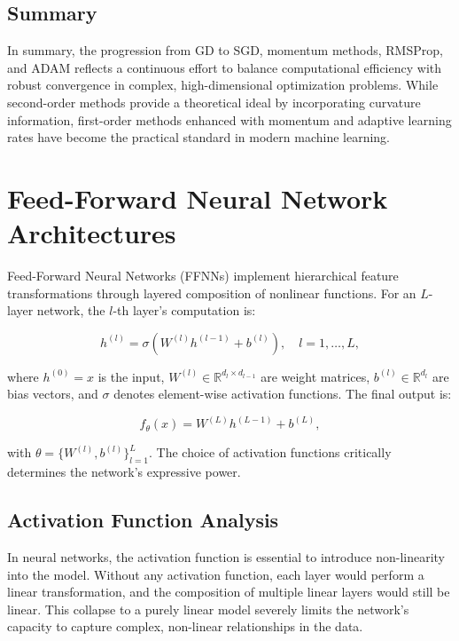 \subsection{Summary}
In summary, the progression from GD to SGD, momentum methods, RMSProp, and ADAM reflects a continuous effort to balance computational efficiency with robust convergence in complex, high-dimensional optimization problems. While second-order methods provide a theoretical ideal by incorporating curvature information, first-order methods enhanced with momentum and adaptive learning rates have become the practical standard in modern machine learning.



\section{Feed-Forward Neural Network Architectures}
\label{sec:ffnn}

Feed-Forward Neural Networks (FFNNs) implement hierarchical feature transformations through layered composition of nonlinear functions. For an $L$-layer network, the $l$-th layer's computation is:

\begin{equation}
h^{(l)} = \sigma\left(W^{(l)} h^{(l-1)} + b^{(l)}\right), \quad l = 1, \dots, L,
\label{eq:ffnn_layer}
\end{equation}

where $h^{(0)} = x$ is the input, $W^{(l)} \in \mathbb{R}^{d_l \times d_{l-1}}$ are weight matrices, $b^{(l)} \in \mathbb{R}^{d_l}$ are bias vectors, and $\sigma$ denotes element-wise activation functions. The final output is:

\[
f_\theta(x) = W^{(L)} h^{(L-1)} + b^{(L)},
\]

with $\theta = \{W^{(l)}, b^{(l)}\}_{l=1}^L$. The choice of activation functions critically determines the network's expressive power.

\subsection{Activation Function Analysis}

In neural networks, the activation function is essential to introduce non-linearity into the model. Without any activation function, each layer would perform a linear transformation, and the composition of multiple linear layers would still be linear. This collapse to a purely linear model severely limits the network’s capacity to capture complex, non-linear relationships in the data.

